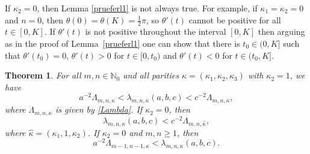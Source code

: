 \documentclass[pdftex]{sigma}
\newtheorem{thm}{Theorem}[section]
\newcommand{\N}{\mathbb{N}}
\numberwithin{equation}{section}
\begin{document}
If $\kappa_2=0$, then Lemma \ref{prueferl1} is not always true. For example, if $\kappa_1=\kappa_2=0$
and $n=0$, then $\theta(0)=\theta(K)=\tfrac12\pi$, so $\theta'(t)$ cannot be positive for all $t\in[0,K]$.
If $\theta'(t)$ is not positive throughout the interval $[0,K]$ then arguing as in the proof of Lemma~\ref{prueferl1}
one can show that there is $t_0\in(0,K]$ such that $\theta'(t_0)=0$, $\theta'(t)>0$ for $t\in[0,t_0)$ and
$\theta'(t)<0$ for $t\in(t_0,K]$.

\begin{thm}%
For all $m,n\in\N_0$ and all parities $\kappa=(\kappa_1,\kappa_2,\kappa_3)$ with $\kappa_2=1$, we have
\begin{equation}\label{ineq1}
 a^{-2}\Lambda_{m,n,\kappa}<\lambda_{m,n,\kappa}(a,b,c)< c^{-2}\Lambda_{m,n,\kappa},
 \end{equation}
where $\Lambda_{m,n,\kappa}$ is given by \eqref{Lambda}.
If $\kappa_2=0$, then
\begin{equation}\label{ineq2}
 \lambda_{m,n,\kappa}(a,b,c)<c^{-2}\Lambda_{m,n,\hat\kappa},
\end{equation}
where $\hat\kappa=(\kappa_1,1,\kappa_2)$.
If $\kappa_2=0$ and $m,n\ge 1$, then
\begin{equation}\label{ineq3}
 a^{-2}\Lambda_{m-1,n-1,\hat\kappa}<\lambda_{m,n,\kappa}(a,b,c) .
\end{equation}
\end{thm}
\end{document}
